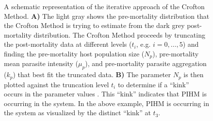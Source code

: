 \documentclass[12pt, a4paper]{article}
\begin{document}
\newpage

\begin{figure}


    \caption{A schematic representation of the iterative approach of the Crofton Method. \textbf{A)} The light gray shows the pre-mortality distribution that the Crofton Method is trying to estimate from the dark grey post-mortality distribution.  The Crofton Method proceeds by truncating the post-mortality data at different levels ($t_i$, e.g. $i= 0, \dots, 5$) and finding the pre-mortality host population size ($N_p$), pre-mortality mean parasite intensity ($\mu_p$), and pre-mortality parasite aggregation ($k_p$) that best fit the truncated data. \textbf{B)} The parameter $N_p$ is then plotted against the truncation level $t_i$ to determine if a ``kink'' occurs in the parameter values  \citep{Lester1984}. This ``kink'' indicates that PIHM is occurring in the system. In the above example, PIHM is occurring in the system as visualized by the distinct ``kink'' at $t_3$.}
    \label{fig:crofton}

\end{figure}

\newpage
\end{document}

